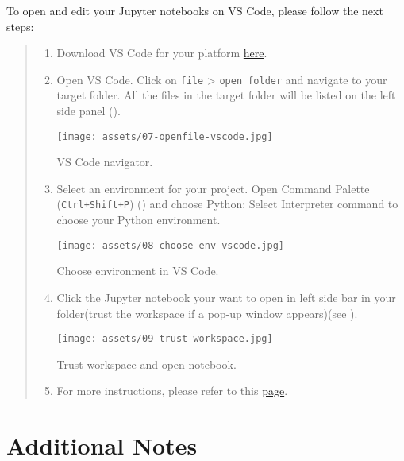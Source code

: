 \documentclass{latex-template/tufte-handout}
\begin{document}
To open and edit your Jupyter notebooks on VS Code, please follow the next steps:
\begin{quote}
\begin{enumerate}
\def\labelenumi{\arabic{enumi}.}
\item Download VS Code for your platform \href{https://code.visualstudio.com/Download}{here}.
\item Open VS Code. Click on \texttt{file} > \texttt{open folder} and navigate to your target folder. All the files in the target folder will be listed on the left side panel ().
    \begin{marginfigure}%
      \texttt{[image: assets/07-openfile-vscode.jpg]}
      \caption{VS Code navigator.}
      \label{fig:vscode-navigator}
    \end{marginfigure}
\item Select an environment for your project. Open Command Palette (\texttt{Ctrl+Shift+P}) () and choose Python: Select Interpreter command to choose your Python environment.
    \begin{marginfigure}%
      \texttt{[image: assets/08-choose-env-vscode.jpg]}
      \caption{Choose environment in VS Code.}
      \label{fig:environment-vscode}
    \end{marginfigure}


\item Click the Jupyter notebook your want to open in left side bar in your folder(trust the workspace if a pop-up window appears)(see ). 
    \begin{marginfigure}%
      \texttt{[image: assets/09-trust-workspace.jpg]}
      \caption{Trust workspace and open notebook.}
      \label{fig:trust-workspace}
    \end{marginfigure}
\item For more instructions, please refer to this \href{https://code.visualstudio.com/docs/datascience/jupyter-notebooks}{page}.
\end{enumerate}
\end{quote}








\section{Additional Notes}
\label{additional-notes}
\end{document}
